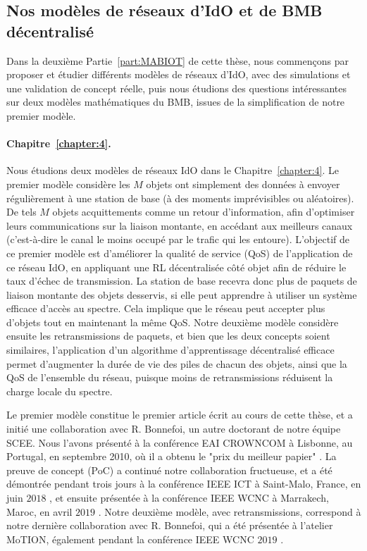 \begin{resume_fr}

\subsection*{Nos modèles de réseaux d'IdO et de BMB décentralisé}

Dans la deuxième Partie~\ref{part:MABIOT} de cette thèse, nous commençons par proposer et étudier différents modèles de réseaux d'IdO, avec des simulations et une validation de concept réelle, puis nous étudions des questions intéressantes sur deux modèles mathématiques du BMB, issues de la simplification de notre premier modèle.


\paragraph{Chapitre~\ref{chapter:4}.}
%
Nous étudions deux modèles de réseaux IdO dans le Chapitre~\ref{chapter:4}.
Le premier modèle considère les $M$ objets ont simplement des données à envoyer régulièrement à une station de base (à des moments imprévisibles ou aléatoires).
De tels $M$ objets acquittements comme un retour d'information, afin d'optimiser leurs communications sur la liaison montante, en accédant aux meilleurs canaux (c'est-à-dire le canal le moins occupé par le trafic qui les entoure).
L'objectif de ce premier modèle est d'améliorer la qualité de service (QoS) de l'application de ce réseau IdO, en appliquant une RL décentralisée côté objet afin de réduire le taux d'échec de transmission.
La station de base recevra donc plus de paquets de liaison montante des objets desservis, si elle peut apprendre à utiliser un système efficace d'accès au spectre.
Cela implique que le réseau peut accepter plus d'objets tout en maintenant la même QoS.
%
Notre deuxième modèle considère ensuite les retransmissions de paquets, et bien que les deux concepts soient similaires, l'application d'un algorithme d'apprentissage décentralisé efficace permet d'augmenter la durée de vie des piles de chacun des objets, ainsi que la QoS de l'ensemble du réseau, puisque moins de retransmissions réduisent la charge locale du spectre.

Le premier modèle constitue le premier article écrit au cours de cette thèse, et a initié une collaboration avec R. Bonnefoi, un autre doctorant de notre équipe SCEE.
Nous l'avons présenté à la conférence EAI CROWNCOM à Lisbonne, au Portugal, en septembre 2010, où il a obtenu le "prix du meilleur papier" \cite{Bonnefoi17}.
%
La preuve de concept (PoC) a continué notre collaboration fructueuse, et a été démontrée pendant trois jours à la conférence IEEE ICT à Saint-Malo, France, en juin $2018$ \cite{Besson2018ICT}, et ensuite présentée à la conférence IEEE WCNC à Marrakech, Maroc, en avril $2019$ \cite{Besson2019WCNC}.
%
Notre deuxième modèle, avec retransmissions, correspond à notre dernière collaboration avec R. Bonnefoi, qui a été présentée à l'atelier MoTION, également pendant la conférence IEEE WCNC $2019$ \cite{Bonnefoi2019WCNC}.



\end{resume_fr}
